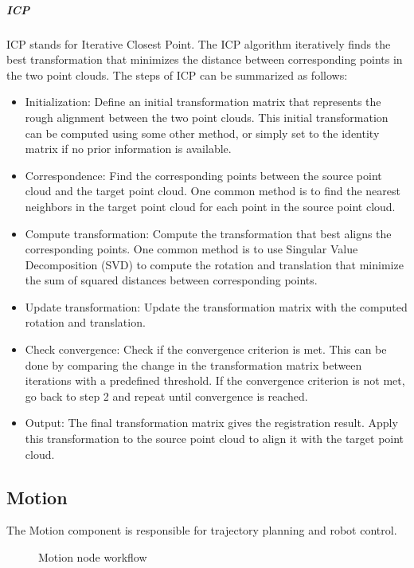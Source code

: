 \documentclass{article}
\begin{document}
	\subparagraph{ICP}
	
	ICP stands for Iterative Closest Point. The ICP algorithm iteratively finds the best transformation that minimizes the distance between corresponding points in the two point clouds. The steps of ICP can be summarized as follows:
	\begin{itemize}
		\item Initialization: Define an initial transformation matrix that represents the rough alignment between the two point clouds. This initial transformation can be computed using some other method, or simply set to the identity matrix if no prior information is available.
		\item Correspondence: Find the corresponding points between the source point cloud and the target point cloud. One common method is to find the nearest neighbors in the target point cloud for each point in the source point cloud.
		\item Compute transformation: Compute the transformation that best aligns the corresponding points. One common method is to use Singular Value Decomposition (SVD) to compute the rotation and translation that minimize the sum of squared distances between corresponding points.
		\item Update transformation: Update the transformation matrix with the computed rotation and translation.
		\item Check convergence: Check if the convergence criterion is met. This can be done by comparing the change in the transformation matrix between iterations with a predefined threshold. If the convergence criterion is not met, go back to step 2 and repeat until convergence is reached.
		\item Output: The final transformation matrix gives the registration result. Apply this transformation to the source point cloud to align it with the target point cloud.
	\end{itemize}
	
	\subsection{Motion}
	The Motion component is responsible for trajectory planning and robot control.
	
	\begin{figure}[!ht]
		\centering
		\caption{Motion node workflow}
		\label{fig:design-motion}
	\end{figure}
	
\end{document}
